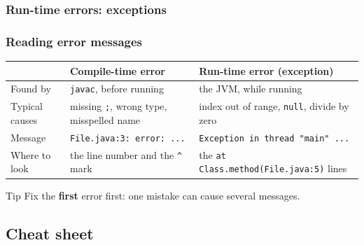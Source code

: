 \documentclass[aspectratio=169,10pt,compress]{beamer}
\begin{document}
\begin{frame}[t,fragile] \frametitle{Run-time errors: exceptions}

  \small {}%
\end{frame}




\begin{frame}[t,fragile] \frametitle{Reading error messages}
  \small
  \begin{tabular}{@{}L{0.2\textwidth}L{0.36\textwidth}L{0.36\textwidth}@{}}
    \toprule
    & \textbf{Compile-time error} & \textbf{Run-time error (exception)} \\
    \midrule
    Found by        & \texttt{javac}, before running   & the JVM, while running \\
    Typical causes  & missing \texttt{;}, wrong type, misspelled name & index out of range, \texttt{null}, divide by zero \\
    Message         & \texttt{File.java:3: error: ...}  & \texttt{Exception in thread "main" ...} \\
    Where to look   & the line number and the \texttt{\^{}} mark & the \texttt{at Class.method(File.java:5)} lines \\
    \bottomrule
  \end{tabular}

  \vspace{0.8em}
  \begin{block}{Tip}
    Fix the \textbf{first} error first: one mistake can cause several messages.
  \end{block}
\end{frame}


\subsection[Cheat]{Cheat sheet}
\end{document}
